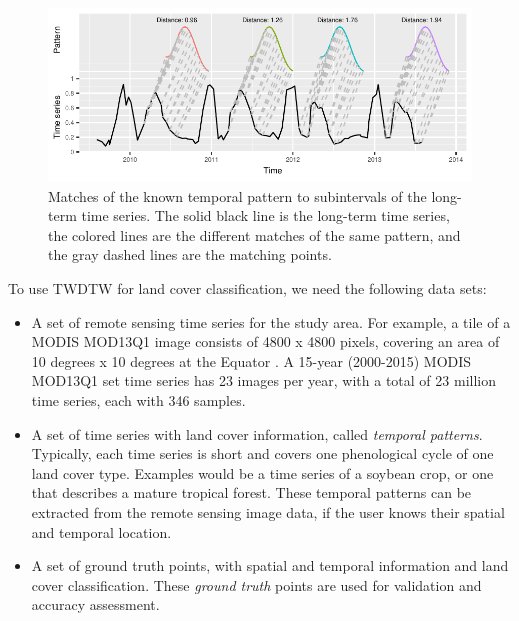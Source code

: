 \documentclass[article,shortnames]{jss}
\begin{document}
\begin{CodeChunk}
\begin{figure}[!h]

{\centering \includegraphics{dtwSat_files/figure-latex/twdtw-example-1} 

}

\caption[Matches of the known temporal pattern to subintervals of the long-term time series]{Matches of the known temporal pattern to subintervals of the long-term time series. The solid black line is the long-term time series, the colored lines are the different matches of the same pattern, and the gray dashed lines are the matching points.}\label{fig:twdtw-example}
\end{figure}
\end{CodeChunk}

To use TWDTW for land cover classification, we need the following data
sets:

\begin{itemize}
\item
  A set of remote sensing time series for the study area. For example, a
  tile of a MODIS MOD13Q1 image consists of 4800 x 4800 pixels, covering
  an area of 10 degrees x 10 degrees at the Equator \citep{Didan:2015}.
  A 15-year (2000-2015) MODIS MOD13Q1 set time series has 23 images per
  year, with a total of 23 million time series, each with 346 samples.
\item
  A set of time series with land cover information, called
  \emph{temporal patterns}. Typically, each time series is short and
  covers one phenological cycle of one land cover type. Examples would
  be a time series of a soybean crop, or one that describes a mature
  tropical forest. These temporal patterns can be extracted from the
  remote sensing image data, if the user knows their spatial and
  temporal location.
\item
  A set of ground truth points, with spatial and temporal information
  and land cover classification. These \emph{ground truth} points are
  used for validation and accuracy assessment.
\end{itemize}
\end{document}
